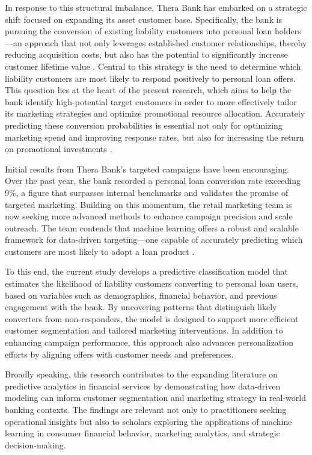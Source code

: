 \documentclass[12pt]{article}
\begin{document}
In response to this structural imbalance, Thera Bank has embarked on a strategic shift focused on expanding its asset customer base. Specifically, the bank is pursuing the conversion of existing liability customers into personal loan holders—an approach that not only leverages established customer relationships, thereby reducing acquisition costs, but also has the potential to significantly increase customer lifetime value \citep{Moro2014ATelemarketing}. Central to this strategy is the need to determine which liability customers are most likely to respond positively to personal loan offers. This question lies at the heart of the present research, which aims to help the bank identify high-potential target customers in order to more effectively tailor its marketing strategies and optimize promotional resource allocation. Accurately predicting these conversion probabilities is essential not only for optimizing marketing spend and improving response rates, but also for increasing the return on promotional investments \citep{Fenton2007VisualisingChange:}.

Initial results from Thera Bank’s targeted campaigns have been encouraging. Over the past year, the bank recorded a personal loan conversion rate exceeding 9\%, a figure that surpasses internal benchmarks and validates the promise of targeted marketing. Building on this momentum, the retail marketing team is now seeking more advanced methods to enhance campaign precision and scale outreach. The team contends that machine learning offers a robust and scalable framework for data-driven targeting—one capable of accurately predicting which customers are most likely to adopt a loan product \citep{Alaraj2021ModellingNetworks}.

To this end, the current study develops a predictive classification model that estimates the likelihood of liability customers converting to personal loan users, based on variables such as demographics, financial behavior, and previous engagement with the bank. By uncovering patterns that distinguish likely converters from non-responders, the model is designed to support more efficient customer segmentation and tailored marketing interventions. In addition to enhancing campaign performance, this approach also advances personalization efforts by aligning offers with customer needs and preferences.

Broadly speaking, this research contributes to the expanding literature on predictive analytics in financial services by demonstrating how data-driven modeling can inform customer segmentation and marketing strategy in real-world banking contexts. The findings are relevant not only to practitioners seeking operational insights but also to scholars exploring the applications of machine learning in consumer financial behavior, marketing analytics, and strategic decision-making.
\end{document}
